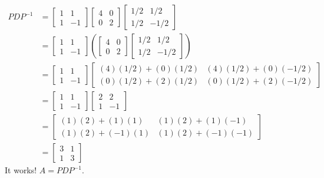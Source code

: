 \documentclass[11pt]{article}
\begin{document}
\begin{example}
\begin{align*} PDP^{-1} &= \begin{bmatrix} 1 & 1 \\ 1 & -1 \end{bmatrix} \begin{bmatrix} 4 & 0 \\ 0 & 2 \end{bmatrix} \begin{bmatrix} 1/2 & 1/2 \\ 1/2 & -1/2 \end{bmatrix} \\ &= \begin{bmatrix} 1 & 1 \\ 1 & -1 \end{bmatrix} \left( \begin{bmatrix} 4 & 0 \\ 0 & 2 \end{bmatrix} \begin{bmatrix} 1/2 & 1/2 \\ 1/2 & -1/2 \end{bmatrix} \right) \\ &= \begin{bmatrix} 1 & 1 \\ 1 & -1 \end{bmatrix} \begin{bmatrix} (4)(1/2) + (0)(1/2) & (4)(1/2) + (0)(-1/2) \\ (0)(1/2) + (2)(1/2) & (0)(1/2) + (2)(-1/2) \end{bmatrix} \\ &= \begin{bmatrix} 1 & 1 \\ 1 & -1 \end{bmatrix} \begin{bmatrix} 2 & 2 \\ 1 & -1 \end{bmatrix} \\ &= \begin{bmatrix} (1)(2)+(1)(1) & (1)(2)+(1)(-1) \\ (1)(2)+(-1)(1) & (1)(2)+(-1)(-1) \end{bmatrix} \\ &= \begin{bmatrix} 3 & 1 \\ 1 & 3 \end{bmatrix} \end{align*}
It works! $A = PDP^{-1}$.

\end{example}
\end{document}
